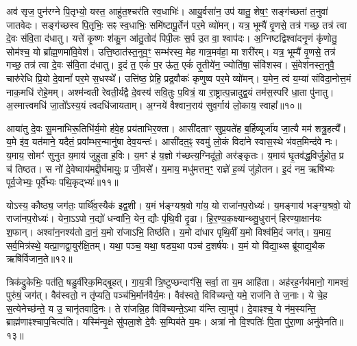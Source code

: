 अव॑ सृज॒ पुन॑रग्ने पि॒तृभ्यो॒ यस्त॒ आहु॑त॒श्चर॑ति स्व॒धाभिः॑। 
आयु॒र्वसा॑न॒ उप॑ यातु॒ शेष॒ꣳ॒ सङ्ग॑च्छतां त॒नुवा॑ जातवेदः। 
सङ्ग॑च्छस्व पि॒तृभिः॒ सꣴ स्व॒धाभिः॒ समि॑ष्टापू॒र्तेन॑ पर॒मे व्यो॑मन्। 
यत्र॒ भूम्यै॑ वृ॒णसे॒ तत्र॑ गच्छ॒ तत्र॑ त्वा दे॒वः स॑वि॒ता द॑धातु। 
यत्ते॑ कृ॒ष्णः  श॑कु॒न आ॑तु॒तोद॑ पिपी॒लः स॒र्प उ॒त वा॒ श्वाप॑दः। 
अ॒ग्निष्टद्विश्वा॑दनृ॒णं कृ॑णोतु॒ सोम॑श्च॒ यो ब्रा᳚ह्म॒णमा॑वि॒वेश॑। 
उत्ति॒ष्ठात॑स्त॒नुव॒ꣳ॒ सम्भ॑रस्व॒ मेह गात्र॒मव॑हा॒ मा शरी॑रम्। 
यत्र॒ भूम्यै॑ वृ॒णसे॒ तत्र॑ गच्छ॒ तत्र॑ त्वा दे॒वः स॑वि॒ता द॑धातु। 
इ॒दं त॒ एकं॑ प॒र ऊ॑त॒ एकं॑ तृ॒तीये॑न॒ ज्योति॑षा॒ संवि॑शस्व। 
सं॒वेश॑नस्त॒नुवै॒ चारु॑रेधि प्रि॒यो दे॒वानां᳚ पर॒मे स॒धस्थे᳚। 
उत्ति॑ष्ठ॒ प्रेहि॒ प्रद्र॒वौकः॑ कृणुष्व पर॒मे व्यो॑मन्। 
य॒मेन॒ त्वं य॒म्या॑ संविदा॒नोत्त॒मं नाक॒मधि॑ रोहे॒मम्। 
अश्म॑न्वती रेवती॒र्यद्वै दे॒वस्य॑ सवि॒तुः प॒वित्रं॒ या रा॒ष्ट्रात्प॒न्नादुद्व॒यं तम॑स॒स्परि॑ धा॒ता पु॑नातु। 
अ॒स्मात्त्वमधि॑ जा॒तो᳚ऽस्य॒यं त्वदधि॑जायताम्। 
अ॒ग्नये॑ वैश्वान॒राय॑ सुव॒र्गाय॑ लो॒काय॒ स्वाहा᳚॥१०॥\ip
\anuvakamend[अव॑शीयताꣳ स॒धस्थे॒ पञ्च॑ च]

आया॑तु दे॒वः सु॒मना॑भिरू॒तिभि॑र्य॒मो ह॑वे॒ह प्रय॑ताभिर॒क्ता। 
आसी॑दताꣳ सुप्र॒यते॑ह ब॒र्\mbox{}हिष्यूर्जा॑य जा॒त्यै मम॑ शत्रु॒हत्यै᳚। 
य॒मे इ॑व॒ यत॑माने॒ यदैतं॒ प्रवा᳚म्भर॒न्मानु॑षा देव॒यन्तः॑। 
आसी॑दत॒ꣴ॒ स्वमु॑ लो॒कं  विदा॑ने स्वास॒स्थे भ॑वत॒मिन्द॑वे नः। 
य॒माय॒ सोमꣳ॑ सुनुत य॒माय॑ जुहुता ह॒विः। 
य॒मꣳ ह॑ य॒ज्ञो ग॑च्छत्य॒ग्निदू॑तो॒ अर॑ङ्कृतः। 
य॒माय॑ घृ॒तव॑द्ध॒विर्जु॒होत॒ प्र च॑ तिष्ठत। 
स नो॑ दे॒वेष्वाय॑मद्दी॒र्घमायुः॒ प्र जी॒वसे᳚। 
य॒माय॒ मधु॑मत्तम॒ꣳ॒ राज्ञे॑ ह॒व्यं जु॑होतन। 
इ॒दं नम॒ ऋषि॑भ्यः पूर्व॒जेभ्यः॒ पूर्वे᳚भ्यः पथि॒कृद्भ्यः॑॥११॥\ip

योऽस्य॒ कौष्ठ्य॒ जग॑तः॒ पार्थि॑व॒स्यैक॑ इद्व॒शी। 
य॒मं भ॑ङ्ग्यश्र॒वो गा॑य॒ यो राजा॑नप॒रोध्यः॑। 
य॒मङ्गाय॑ भङ्ग्य॒श्रवो॒ यो राजा॑नप॒रोध्यः॑। 
येना॒ऽऽपो न॒द्यो॑ धन्वा॑नि॒ येन॒ द्यौः पृ॑थि॒वी दृ॒ढा। 
हि॒र॒ण्य॒क॒क्ष्यान्थ्सु॒धुरान्॑ हिरण्या॒क्षान॑यः  श॒फान्। 
अश्वा॑न॒नश्य॑तो दा॒नं॒ य॒मो रा॑जाऽभि॒ तिष्ठ॑ति। 
य॒मो दा॑धार पृथि॒वीं य॒मो विश्व॑मि॒दं जग॑त्। 
य॒माय॒ सर्व॒मित्र॑स्थे॒ यत्प्रा॒णद्वा॒युर॑क्षि॒तम्। 
यथा॒ पञ्च॒ यथा॒ षड्य॒था पञ्च॑ द॒शर्\mbox{}ष॑यः। 
य॒मं यो वि॑द्या॒थ्स ब्रू॑याद्य॒थैक ऋषि॑र्विजान॒ते॥१२॥\ip

त्रिक॑द्रुकेभिः॒ पत॑ति॒ षडु॒र्वीरेक॒मिद्बृ॒हत्। 
गा॒य॒त्री त्रि॒ष्टुप्छन्दाꣳ॑सि॒ सर्वा॒ ता य॒म आहि॑ता। 
अह॑रह॒र्नय॑मानो॒ गामश्वं॒ पुरु॑षं॒ जग॑त्। 
वैव॑स्वतो॒ न तृ॑प्यति॒ पञ्च॑भि॒र्मान॑वैर्य॒मः। 
वैव॑स्वते॒ विवि॑च्यन्ते॒ यमे॒ राज॑नि ते ज॒नाः। 
ये चे॒ह स॒त्येनेच्छ॑न्ते॒ य उ॒ चानृ॑तवादि॒नः। 
ते रा॑जन्नि॒ह विवि॑च्यन्ते॒ऽथा य॑न्ति त्वा॒मुप॑। 
दे॒वाꣴश्च॒ ये न॑म॒स्यन्ति॒ ब्राह्म॑णाꣴश्चाप॒चित्य॑ति। 
यस्मि॑न्वृ॒क्षे सु॑पला॒शे दे॒वैः स॒म्पिब॑ते य॒मः। 
अत्रा॑ नो वि॒श्पतिः॑ पि॒ता पु॑रा॒णा अनु॑वेनति॥१३॥\ip
\anuvakamend[प॒थि॒कृद्भ्यो॑ विजान॒तेऽनु॑ वेनति]

